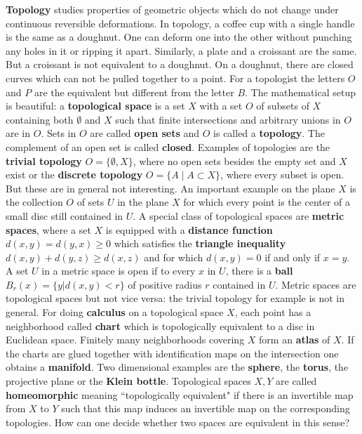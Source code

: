 \documentclass[12pt]{amsart}
\newcounter{example}    \def\example#1{ \item \fontsize{12}{15} \selectfont #1 \fontsize{12}{15} \selectfont }
\begin{document}
{\bf Topology} studies properties of geometric objects
which do not change under continuous reversible deformations. 
In topology, a coffee cup with a single handle is the same as
a doughnut. One can deform one into the other without punching 
any holes in it or ripping it apart. Similarly, a plate and a 
croissant are the same. But a croissant is not equivalent to a doughnut.
On a doughnut, there are closed curves which can not be pulled together to 
a point. For a topologist the letters $O$ and $P$ are the equivalent but 
different from the letter $B$. The mathematical setup is beautiful: 
a {\bf topological space} is a set $X$ with a set $O$ of subsets of $X$ containing both 
$\emptyset$ and $X$ such that finite intersections and arbitrary 
unions in $O$ are in $O$. Sets in $O$ are called {\bf open sets} and $O$ is called a 
{\bf topology}. The complement of an open set is called 
{\bf closed}. Examples of topologies are the {\bf trivial topology }
$O=\{\emptyset,X \}$, where no open sets besides the empty set 
and $X$ exist or the {\bf discrete topology} $O = \{A \; | \;  A \subset X \}$,
where every subset is open. But these are in general not interesting.
An important example on the plane $X$ is the collection $O$ of sets 
$U$ in the plane $X$ for which every point is the center of a small 
disc still contained in $U$. A special class of topological 
spaces are {\bf metric spaces}, where a set $X$ is equipped with a 
{\bf distance function} $d(x,y)=d(y,x) \geq 0$ which satisfies 
the {\bf triangle inequality} $d(x,y)+d(y,z) \geq d(x,z)$ and for 
which $d(x,y)=0$ if and only if $x=y$.  A set $U$ in a metric 
space is open if to every $x$ in $U$, there is a 
{\bf ball} $B_{r}(x) = \{ y| d(x,y)<r \}$ of positive radius $r$ 
contained in $U$. Metric spaces are topological spaces but not vice versa:
the trivial topology for example is not in general. 
For doing {\bf calculus} on a topological space $X$, 
each point has a neighborhood called {\bf chart} which is topologically 
equivalent to a disc in Euclidean space. Finitely many
neighborhoods covering $X$ form an {\bf atlas} of $X$. If the charts 
are glued together with identification maps on the intersection
one obtains a {\bf manifold}. Two dimensional examples are the {\bf sphere}, the 
{\bf torus}, the projective plane or the {\bf Klein bottle}. Topological spaces 
$X,Y$ are called {\bf homeomorphic} meaning ``topologically equivalent" 
if there is an invertible map from $X$ to $Y$ such that this map
induces an invertible map on the corresponding topologies. 
How can one decide whether two spaces are equivalent in this sense?
\end{document}
